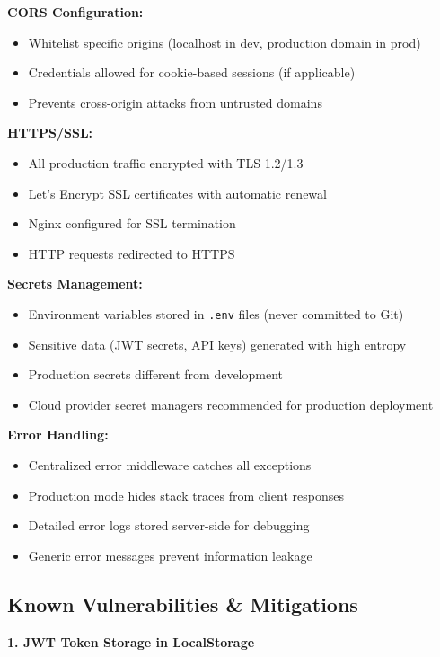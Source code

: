 \documentclass[12pt,a4paper]{article}
\begin{document}
\textbf{CORS Configuration:}
\begin{itemize}[noitemsep]
  \item Whitelist specific origins (localhost in dev, production domain in prod)
  \item Credentials allowed for cookie-based sessions (if applicable)
  \item Prevents cross-origin attacks from untrusted domains
\end{itemize}

\textbf{HTTPS/SSL:}
\begin{itemize}[noitemsep]
  \item All production traffic encrypted with TLS 1.2/1.3
  \item Let's Encrypt SSL certificates with automatic renewal
  \item Nginx configured for SSL termination
  \item HTTP requests redirected to HTTPS
\end{itemize}

\textbf{Secrets Management:}
\begin{itemize}[noitemsep]
  \item Environment variables stored in \texttt{.env} files (never committed to Git)
  \item Sensitive data (JWT secrets, API keys) generated with high entropy
  \item Production secrets different from development
  \item Cloud provider secret managers recommended for production deployment
\end{itemize}

\textbf{Error Handling:}
\begin{itemize}[noitemsep]
  \item Centralized error middleware catches all exceptions
  \item Production mode hides stack traces from client responses
  \item Detailed error logs stored server-side for debugging
  \item Generic error messages prevent information leakage
\end{itemize}

\subsection{Known Vulnerabilities \& Mitigations}

\textbf{1. JWT Token Storage in LocalStorage}
\end{document}
